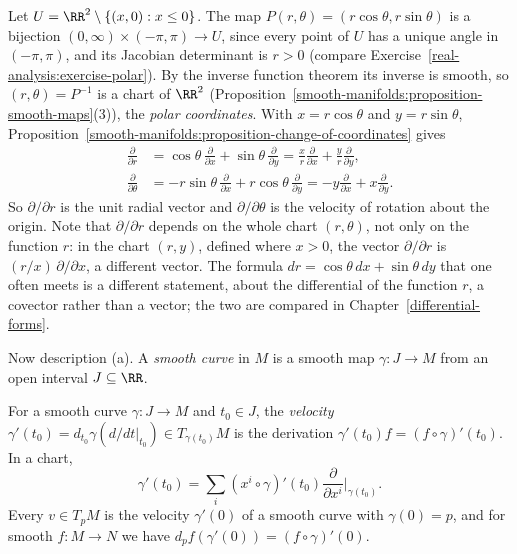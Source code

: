 \begin{example}\label{smooth-manifolds:example-polar}
Let $U = \RR^2 \setminus \{(x, 0) : x \leq 0\}$. The map $P(r, \theta) = (r\cos\theta, r\sin\theta)$ is a bijection $(0, \infty) \times (-\pi, \pi) \to U$,
since every point of $U$ has a unique angle in $(-\pi, \pi)$, and its Jacobian determinant is $r > 0$ (compare Exercise~\ref{real-analysis:exercise-polar}).
By the inverse function theorem its inverse is smooth, so $(r, \theta) = P^{-1}$ is a chart of $\RR^2$
(Proposition~\ref{smooth-manifolds:proposition-smooth-maps}(3)), the \emph{polar coordinates}. With $x = r\cos\theta$ and $y = r\sin\theta$,
Proposition~\ref{smooth-manifolds:proposition-change-of-coordinates} gives
\[
\begin{aligned}
\frac{\partial}{\partial r} &= \cos\theta\,\frac{\partial}{\partial x} + \sin\theta\,\frac{\partial}{\partial y} = \frac{x}{r}\frac{\partial}{\partial x} + \frac{y}{r}\frac{\partial}{\partial y}, \\
\frac{\partial}{\partial\theta} &= -r\sin\theta\,\frac{\partial}{\partial x} + r\cos\theta\,\frac{\partial}{\partial y} = -y\frac{\partial}{\partial x} + x\frac{\partial}{\partial y}.
\end{aligned}
\]
So $\partial/\partial r$ is the unit radial vector and $\partial/\partial\theta$ is the velocity of rotation about the origin. Note that $\partial/\partial r$
depends on the whole chart $(r, \theta)$, not only on the function $r$: in the chart $(r, y)$, defined where $x > 0$, the vector $\partial/\partial r$ is
$(r/x)\,\partial/\partial x$, a different vector. The formula $dr = \cos\theta\,dx + \sin\theta\,dy$ that one often meets is a different statement, about the differential
of the function $r$, a covector rather than a vector; the two are compared in Chapter~\ref{differential-forms}.
\end{example}

Now description (a). A \emph{smooth curve} in $M$ is a smooth map $\gamma \colon J \to M$ from an open interval $J \subseteq \RR$.

\begin{proposition}\label{smooth-manifolds:proposition-velocity}
For a smooth curve $\gamma \colon J \to M$ and $t_0 \in J$, the \emph{velocity} $\gamma'(t_0) = d_{t_0}\gamma(d/dt|_{t_0}) \in T_{\gamma(t_0)}M$ is the derivation
$\gamma'(t_0)f = (f \circ \gamma)'(t_0)$. In a chart,
\[
\gamma'(t_0) = \sum_i(x^i \circ \gamma)'(t_0)\frac{\partial}{\partial x^i}\Big|_{\gamma(t_0)}.
\]
Every $v \in T_pM$ is the velocity $\gamma'(0)$ of a smooth curve with $\gamma(0) = p$, and for smooth $f \colon M \to N$ we have
$d_pf(\gamma'(0)) = (f \circ \gamma)'(0)$.
\end{proposition}

